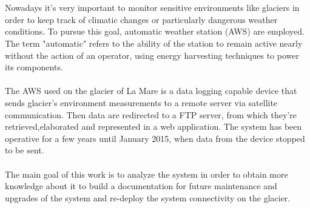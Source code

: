 \section*{}
\paragraph{}
Nowadays it's very important to monitor sensitive environments like glaciers in order to keep track of climatic changes or particularly dangerous weather conditions. To pursue this goal, automatic weather station (AWS) are employed. The term "automatic" refers to the ability of the station to remain active nearly without the action of an operator, using energy harvesting techniques to power its components.
\paragraph{}
The AWS used on the glacier of La Mare is a data logging capable device that sends glacier's environment measurements to a remote server via satellite communication. Then data are redirected to a FTP server, from which they're retrieved,elaborated and represented in a web application. The system has been operative for a few years until January 2015, when data from the device stopped to be sent.
\paragraph{}
The main goal of this work is to analyze the system in order to obtain more knowledge about it to build a documentation for future maintenance and upgrades of the system and re-deploy the system connectivity on the glacier.
\clearpages